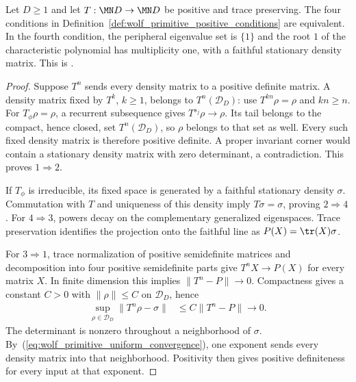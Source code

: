 \begin{theorem}
    \label{thm:wolf_primitive_positive_equivalences}
    \leanok
    Let $D\geq1$ and let $T:\MN D\to\MN D$ be positive and trace preserving.
    The four conditions in Definition~\ref{def:wolf_primitive_positive_conditions}
    are equivalent. In the fourth condition, the peripheral eigenvalue set
    is $\{1\}$ and the root $1$ of the characteristic polynomial has
    multiplicity one, with a faithful stationary density matrix.
    This is \cite[Theorem~6.7]{Wolf2012Quantum}.
\end{theorem}
\begin{proof}\leanok
    Suppose $T^n$ sends every density matrix to a positive definite matrix.
    A density matrix fixed by $T^k$, $k\geq1$, belongs to
    $T^n(\mathcal D_D)$: use $T^{kn}\rho=\rho$ and $kn\geq n$.
    For $T_\phi\rho=\rho$, a recurrent subsequence gives
    $T^{s_j}\rho\to\rho$. Its tail belongs to the compact, hence closed,
    set $T^n(\mathcal D_D)$, so $\rho$ belongs to that set as well.
    Every such fixed density matrix is therefore positive definite.
    A proper invariant corner would contain a stationary density matrix
    with zero determinant, a contradiction. This proves $1\Rightarrow2$.

    If $T_\phi$ is irreducible, its fixed space is generated by a faithful
    stationary density $\sigma$. Commutation with $T$ and uniqueness of this
    density imply $T\sigma=\sigma$, proving $2\Rightarrow4$.
    For $4\Rightarrow3$, powers decay on the complementary generalized
    eigenspaces. Trace preservation identifies the projection onto the
    faithful line as $P(X)=\tr(X)\sigma$.

    For $3\Rightarrow1$, trace normalization of positive semidefinite
    matrices and decomposition into four positive semidefinite parts give
    $T^nX\to P(X)$ for every matrix $X$. In finite dimension this implies
    $\|T^n-P\|\to0$. Compactness gives a constant $C>0$ with
    $\|\rho\|\leq C$ on $\mathcal D_D$, hence
    \begin{align}
        \sup_{\rho\in\mathcal D_D}\|T^n\rho-\sigma\|
            &\leq C\|T^n-P\|\longrightarrow0.
        \label{eq:wolf_primitive_uniform_convergence}
    \end{align}
    The determinant is nonzero throughout a neighborhood of $\sigma$.
    By~(\ref{eq:wolf_primitive_uniform_convergence}), one exponent sends
    every density matrix into that neighborhood. Positivity then gives
    positive definiteness for every input at that exponent.
\end{proof}

